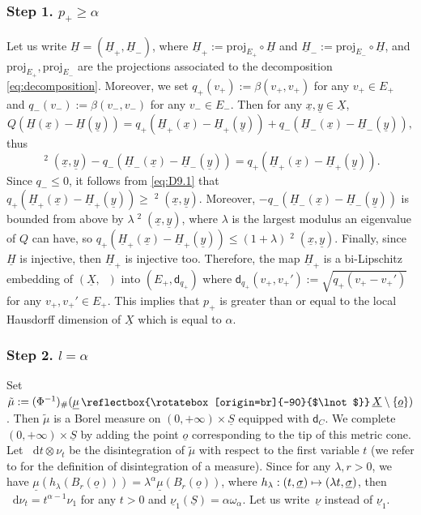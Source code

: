 \documentclass[10pt]{amsart}
\newcommand\mto{\mathchoice{\longmapsto}{\mapsto}{\mapsto}{\mapsto}}
\let\backslash\setminus
\theoremstyle{plain}
\theoremstyle{definition}
\newcommand{\di}{\mathop{}\!\mathrm{d}}
\newcommand{\measrestr}{%
\,\raisebox{-.127ex}{\reflectbox{\rotatebox[origin=br]{-90}{$\lnot$}}}\,%
}
\newcommand{\dist}{\mathsf{d}}
\newcommand{\uX}{\underline{X}}
\newcommand{\usigma}{\underline{\sigma}}
\DeclareMathOperator{\udist}{\underline{\dist}}
\newcommand{\uo}{\underline{o}}
\newcommand{\ux}{\underline{x}}
\newcommand{\uH}{\underline{H}}
\newcommand{\uS}{\underline{S}}
\newcommand{\umu}{\underline{\mu}}
\newcommand{\unu}{\underline{\nu}}
\newcommand{\uy}{\underline{y}}
\begin{document}
\subsubsection*{Step 1. $p_+ \ge \alpha$}

Let us write $\uH=(\uH_+,\uH_-)$, where $\uH_+:=\mathrm{proj}_{E_+} \circ \uH$ and $\uH_-:=\mathrm{proj}_{E_-} \circ \uH$, and $\mathrm{proj}_{E_+}, \mathrm{proj}_{E_-}$ are the projections associated to the decomposition \eqref{eq:decomposition}. Moreover, we set $q_+(v_+):=\beta(v_+,v_+)$ for any $v_+ \in E_+$ and $q_-(v_-):=\beta(v_-,v_-)$ for any $v_- \in E_-$. Then for any $\ux, \uy \in \uX$,
\[
Q(\uH(\ux)-\uH(\uy)) = q_+(\uH_+(\ux)-\uH_+(\uy)) + q_-(\uH_-(\ux)-\uH_-(\uy)),
\]
thus
\begin{equation}\label{eq:D9.1}
\udist^2(\ux,\uy) - q_-(\uH_-(\ux)-\uH_-(\uy)) = q_+(\uH_+(\ux)-\uH_+(\uy)).
\end{equation}
Since $q_- \le 0$, it follows from \eqref{eq:D9.1} that $q_+(\uH_+(\ux)-\uH_+(\uy)) \ge \udist^2(\ux,\uy)$. Moreover, $- q_-(\uH_-(\ux)-\uH_-(\uy))$ is bounded from above by $\lambda \udist^2(\ux,\uy)$, where $\lambda$ is the largest modulus an eigenvalue of $Q$ can have, so $q_+(\uH_+(\ux)-\uH_+(\uy)) \le (1+\lambda)\udist^2(\ux,\uy)$. Finally, since $\uH$ is injective, then $\uH_+$ is injective too. Therefore, the map $\uH_+$ is a bi-Lipschitz embedding of $(\uX,\udist)$ into $(E_+,\dist_{q_+})$ where $\dist_{q_+}(v_+,v_+'):=\sqrt{q_+(v_+-v_+')}$ for any $v_+, v_+' \in E_+$. This implies that $p_+$ is greater than or equal to the local Hausdorff dimension of $\uX$ which is equal to $\alpha$.

\subsubsection*{Step 2. $l=\alpha$}

Set $\tilde{\mu}:= (\Phi^{-1})_{\#}(\umu \measrestr \uX \backslash \{\uo\})$. Then $\tilde{\mu}$ is a Borel measure on $(0,+\infty)\times \uS$ equipped with $\dist_C$. We complete $(0,+\infty)\times \uS$ by adding the point $\uo$ corresponding to the tip of this metric cone. Let $\di t \otimes \nu_t$ be the disintegration of $\tilde{\mu}$ with respect to the first variable $t$ (we refer to \cite[2.5]{AmbrosioFuscoPallara} for the definition of disintegration of a measure). Since for any $\lambda,r>0$, we have $\umu(h_{\lambda}(B_r(\uo)))=\lambda^{\alpha} \umu(B_r(\uo))$, where $h_\lambda: (t,\usigma)\mto (\lambda t, \usigma)$, then $\di \nu_t=t^{\alpha-1}\nu_1$ for any $t>0$ and $\unu_1(\uS)=\alpha \omega_\alpha$. Let us write~$\unu$ instead of $\unu_1$.
\end{document}

